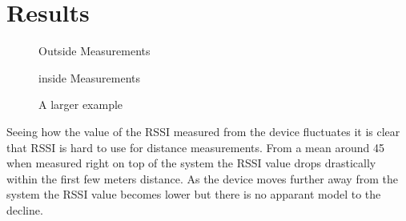 \section{Results}
\label{sec_results}

\begin{figure}		



\caption{ Outside Measurements }
\label{graf_OutsideMesurements}

\end{figure}

\begin{figure}		
	
	
	
	\caption{ inside Measurements }
	\label{graf_InsideMesurements}
	
\end{figure}


\begin{figure}
	
	
	\caption{A larger example}
\end{figure}

Seeing how the value of the RSSI measured from the device fluctuates it is clear that RSSI is hard to use for distance measurements. From a mean around 45 when measured right on top of the system the RSSI value drops drastically within the first few meters distance. As the device moves further away from the system the RSSI value becomes lower but there is no apparant model to the decline.
